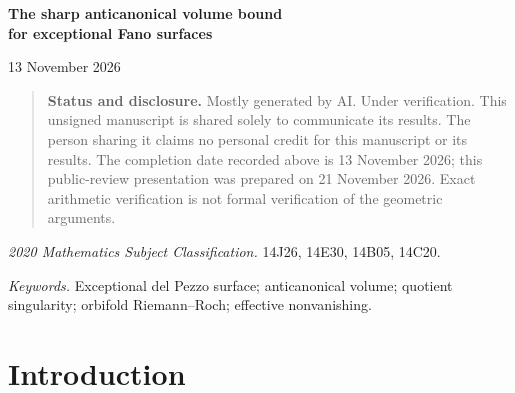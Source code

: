 \documentclass[12pt,a4paper]{article}
\numberwithin{equation}{section}
\theoremstyle{definition}
\newcommand{\PP}{\mathbb P}
\begin{document}
\begin{center}
{\Large\bfseries The sharp anticanonical volume bound\\[3pt]
for exceptional Fano surfaces\par}
\vspace{12pt}
13 November 2026
\end{center}
\begin{abstract}
We prove that every exceptional complex klt del Pezzo surface has
anticanonical volume at least \(1/31801\). The bound is attained by
Totaro's hypersurface of degree \(354\) in
\(\PP(11,49,118,177)\), and no restriction on the Picard number is imposed.
The proof combines orbifold Riemann--Roch with the
K\"ahler--Einstein inequality, a finite catalogue of quotient
singularities, and the geometry of the reduced support of a first
anticanonical member. In the potentially extremal range, these arguments
force the first anticanonical section to occur in degree eleven.
A rational linear certificate then yields the sharp bound.
The infinite local families are controlled analytically, and the
remaining finite calculations are supplied with exact, solver-free
verification programs. The bound also holds for exceptional klt weak
del Pezzo surfaces. We do not classify the surfaces attaining equality.
\end{abstract}

\begin{quote}\small
\textbf{Status and disclosure.}
Mostly generated by AI. Under verification.
This unsigned manuscript is shared solely to communicate its results.
The person sharing it claims no personal credit for this manuscript or
its results. The completion date recorded above is 13 November 2026;
this public-review presentation was prepared on 21 November 2026.
Exact arithmetic verification is not formal verification of the
geometric arguments.
\end{quote}

\noindent\textit{2020 Mathematics Subject Classification.}
14J26, 14E30, 14B05, 14C20.

\noindent\textit{Keywords.}
Exceptional del Pezzo surface; anticanonical volume; quotient
singularity; orbifold Riemann--Roch; effective nonvanishing.

\clearpage
\begingroup
\fontsize{10}{11.2}\selectfont
\setlength{\parskip}{0pt}
\tableofcontents
\endgroup
\clearpage

\section{Introduction}\label{sec:intro}
\end{document}
